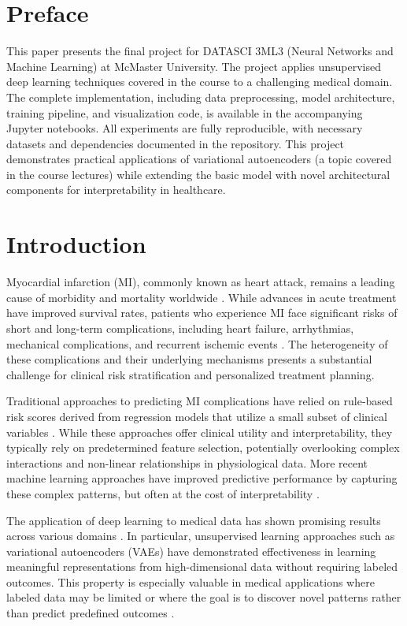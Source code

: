 \documentclass[oupdraft]{bio}
\begin{document}
\section*{Preface}
This paper presents the final project for DATASCI 3ML3 (Neural Networks and Machine Learning) at McMaster University. The project applies unsupervised deep learning techniques covered in the course to a challenging medical domain. The complete implementation, including data preprocessing, model architecture, training pipeline, and visualization code, is available in the accompanying Jupyter notebooks. All experiments are fully reproducible, with necessary datasets and dependencies documented in the repository. This project demonstrates practical applications of variational autoencoders (a topic covered in the course lectures) while extending the basic model with novel architectural components for interpretability in healthcare.

\section{Introduction}
\label{sec1}

Myocardial infarction (MI), commonly known as heart attack, remains a leading cause of morbidity and mortality worldwide \citep{Thygesen2018}. While advances in acute treatment have improved survival rates, patients who experience MI face significant risks of short and long-term complications, including heart failure, arrhythmias, mechanical complications, and recurrent ischemic events \citep{Reed2017}. The heterogeneity of these complications and their underlying mechanisms presents a substantial challenge for clinical risk stratification and personalized treatment planning.

Traditional approaches to predicting MI complications have relied on rule-based risk scores derived from regression models that utilize a small subset of clinical variables \citep{Morrow2012}. While these approaches offer clinical utility and interpretability, they typically rely on predetermined feature selection, potentially overlooking complex interactions and non-linear relationships in physiological data. More recent machine learning approaches have improved predictive performance by capturing these complex patterns, but often at the cost of interpretability \citep{Antman2000, Krumholz2006}.

The application of deep learning to medical data has shown promising results across various domains \citep{Miotto2018}. In particular, unsupervised learning approaches such as variational autoencoders (VAEs) \citep{Kingma2014} have demonstrated effectiveness in learning meaningful representations from high-dimensional data without requiring labeled outcomes. This property is especially valuable in medical applications where labeled data may be limited or where the goal is to discover novel patterns rather than predict predefined outcomes \citep{Way2018}.
\end{document}
